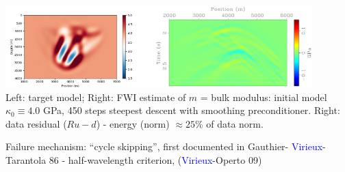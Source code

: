 \documentclass[xcolor=dvipsnames,12pt,aspectratio=169]{beamer}
\begin{document}
\begin{frame}
\begin{center}
\includegraphics[height=1.25in]{Fig/covmestfwi2.png}\includegraphics[height=1.25in]{Fig/residcovmestfwi2wind.pdf}\\
\vspace{0.5cm}
Left: target model; 
Right: FWI estimate of $m$ = bulk modulus: initial model $\kappa_0
\equiv 4.0$ GPa, 450 steps steepest descent with smoothing
preconditioner. Right: data residual ($Ru - d$) - energy (norm)
$\approx 25$\% of data norm.
\end{center}

Failure mechanism: ``cycle skipping'', first documented in Gauthier-
\textcolor{blue}{Virieux}-Tarantola 86 - half-wavelength
criterion, (\textcolor{blue}{Virieux}-Operto 09)
\end{frame}





\end{document}
